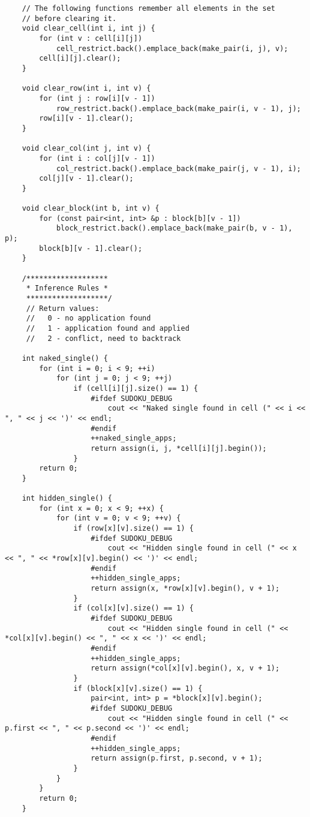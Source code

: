 \documentclass{article}
\begin{document}
\begin{lstlisting}
    // The following functions remember all elements in the set
    // before clearing it.
    void clear_cell(int i, int j) {
        for (int v : cell[i][j])
            cell_restrict.back().emplace_back(make_pair(i, j), v);
        cell[i][j].clear();
    }

    void clear_row(int i, int v) {
        for (int j : row[i][v - 1])
            row_restrict.back().emplace_back(make_pair(i, v - 1), j);
        row[i][v - 1].clear();
    }

    void clear_col(int j, int v) {
        for (int i : col[j][v - 1])
            col_restrict.back().emplace_back(make_pair(j, v - 1), i);
        col[j][v - 1].clear();
    }

    void clear_block(int b, int v) {
        for (const pair<int, int> &p : block[b][v - 1])
            block_restrict.back().emplace_back(make_pair(b, v - 1), p);
        block[b][v - 1].clear();
    }

    /*******************
     * Inference Rules *
     *******************/
     // Return values:
     //   0 - no application found
     //   1 - application found and applied
     //   2 - conflict, need to backtrack

    int naked_single() {
        for (int i = 0; i < 9; ++i)
            for (int j = 0; j < 9; ++j)
                if (cell[i][j].size() == 1) {
                    #ifdef SUDOKU_DEBUG
                        cout << "Naked single found in cell (" << i << ", " << j << ')' << endl;
                    #endif
                    ++naked_single_apps;
                    return assign(i, j, *cell[i][j].begin());
                }
        return 0;
    }

    int hidden_single() {
        for (int x = 0; x < 9; ++x) {
            for (int v = 0; v < 9; ++v) {
                if (row[x][v].size() == 1) {
                    #ifdef SUDOKU_DEBUG
                        cout << "Hidden single found in cell (" << x << ", " << *row[x][v].begin() << ')' << endl;
                    #endif
                    ++hidden_single_apps;
                    return assign(x, *row[x][v].begin(), v + 1);
                }
                if (col[x][v].size() == 1) {
                    #ifdef SUDOKU_DEBUG
                        cout << "Hidden single found in cell (" << *col[x][v].begin() << ", " << x << ')' << endl;
                    #endif
                    ++hidden_single_apps;
                    return assign(*col[x][v].begin(), x, v + 1);
                }
                if (block[x][v].size() == 1) {
                    pair<int, int> p = *block[x][v].begin();
                    #ifdef SUDOKU_DEBUG
                        cout << "Hidden single found in cell (" << p.first << ", " << p.second << ')' << endl;
                    #endif
                    ++hidden_single_apps;
                    return assign(p.first, p.second, v + 1);
                }
            }
        }
        return 0;
    }


\end{lstlisting}
\end{document}
